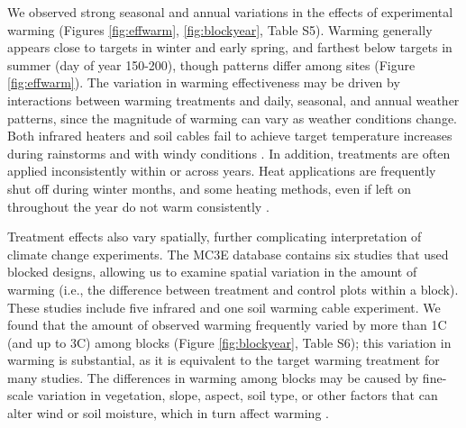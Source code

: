 \documentclass{article}
\begin{document}
\par We observed strong seasonal and annual variations in the effects of experimental warming (Figures \ref{fig:effwarm}, \ref{fig:blockyear}, Table S5). Warming generally appears close to targets in winter and early spring, and farthest below targets in summer (day of year 150-200), though patterns differ among sites (Figure \ref{fig:effwarm}). 
The variation in warming effectiveness may be driven by interactions between warming treatments and daily, seasonal, and annual weather patterns, since the magnitude of warming can vary as weather conditions change. Both infrared heaters and soil cables fail to achieve target temperature increases during rainstorms \citep{peterjohn1993,hoeppner2012} and with windy conditions \citep{kimball2005,kimball2008}. In addition, treatments are often applied inconsistently within or across years. Heat applications are frequently shut off during winter months, and some heating methods, even if left on throughout the year do not warm consistently \citep[e.g.][]{clark2014a,clark2014b,hagedorn2010}.

\par Treatment effects also vary spatially, further complicating interpretation of climate change experiments. The MC3E database contains six studies that used blocked designs, allowing us to examine spatial variation in the amount of warming (i.e., the difference between treatment and control plots within a block). These studies include five infrared and one soil warming cable experiment. We found that the amount of observed warming frequently varied by more than 1\degree C (and up to 3\degree C) among blocks (Figure \ref{fig:blockyear}, Table S6); this variation in warming is substantial, as it is equivalent to the target warming treatment for many studies. %
 The differences in warming among blocks may be caused by fine-scale variation in vegetation, slope, aspect, soil type, or other factors that can alter wind or soil moisture, which in turn affect warming \citep{peterjohn1993,kimball2005,kimball2008,hoeppner2012,rollinson2015}. %
\end{document}
